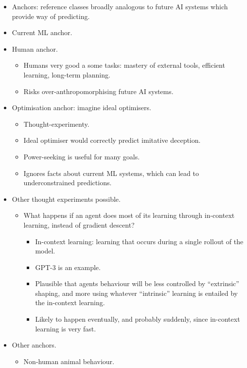 \begin{itemize}
    \item Anchors: reference classes broadly analogous to future AI systems which provide way of predicting.
    \item Current ML anchor.
    \item Human anchor.
    \begin{itemize}
        \item Humans very good a some tasks: mastery of external tools, efficient learning, long-term planning.
        \item Risks over-anthropomorphising future AI systems.
    \end{itemize}
    \item Optimisation anchor: imagine ideal optimisers.
    \begin{itemize}
        \item Thought-experimenty.
        \item Ideal optimiser would correctly predict imitative deception.
        \item Power-seeking is useful for many goals.
        \item Ignores facts about current ML systems, which can lead to underconstrained predictions.
    \end{itemize}
    \item Other thought experiments possible.
    \begin{itemize}
        \item What happens if an agent does most of its learning through in-context learning, instead of gradient descent?
        \begin{itemize}
            \item In-context learning: learning that occurs during a single rollout of the model.
            \item GPT-3 is an example.
            \item Plausible that agents behaviour will be less controlled by ``extrinsic'' shaping, and more using whatever ``intrinsic'' learning is entailed by the in-context learning.
            \item Likely to happen eventually, and probably suddenly, since in-context learning is very fast.
        \end{itemize}
    \end{itemize}
    \item Other anchors.
    \begin{itemize}
        \item Non-human animal behaviour.

\end{itemize}
\end{itemize}
